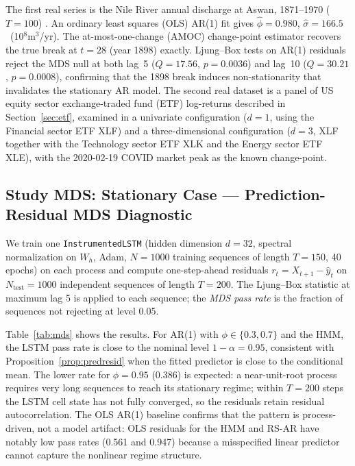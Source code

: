 \documentclass[bj,authoryear]{imsart}
\theoremstyle{plain}
\theoremstyle{definition}
\begin{document}
The first real series is the Nile River annual discharge at Aswan, 1871--1970
($T=100$) \citep{cobb1978problem}.
An ordinary least squares (OLS) AR(1) fit gives $\hat\phi = 0.980$, $\hat\sigma = 166.5$~(10$^8$m$^3$/yr).
The at-most-one-change (AMOC) change-point estimator \citep[Sec.~3.1]{killick2012optimal}
recovers the true break at $t = 28$ (year 1898) exactly.
Ljung--Box tests on AR(1) residuals reject the MDS null at both lag~5
($Q = 17.56$, $p = 0.0036$) and lag~10 ($Q = 30.21$, $p = 0.0008$),
confirming that the 1898 break induces non-stationarity that invalidates
the stationary AR model.
The second real dataset is a panel of US equity sector exchange-traded fund
(ETF) log-returns described in Section~\ref{sec:etf}, examined in a univariate
configuration ($d=1$, using the Financial sector ETF XLF) and a three-dimensional
configuration ($d=3$, XLF together with the Technology sector ETF XLK and the
Energy sector ETF XLE), with the 2020-02-19 COVID market peak as the known
change-point.

\subsection{Study MDS: Stationary Case --- Prediction-Residual MDS Diagnostic}
\label{sec:mds}

We train one \texttt{InstrumentedLSTM} (hidden dimension $d=32$, spectral
normalization on $W_h$, Adam, $N=1000$ training sequences of length $T=150$,
40 epochs) on each process and compute one-step-ahead residuals
$r_t = X_{t+1} - \hat{y}_t$ on $N_\text{test} = 1000$ independent sequences
of length $T = 200$.  The Ljung--Box statistic \citep{ljung1978measure} at maximum lag 5 is applied
to each sequence; the \emph{MDS pass rate} is the fraction of sequences not
rejecting at level 0.05.

Table~\ref{tab:mds} shows the results.
For AR(1) with $\phi \in \{0.3, 0.7\}$ and the HMM, the LSTM pass rate is
close to the nominal level $1-\alpha = 0.95$, consistent with
Proposition~\ref{prop:predresid} when the fitted predictor is close to the
conditional mean.
The lower rate for $\phi = 0.95$ (0.386) is expected: a near-unit-root
process requires very long sequences to reach its stationary regime; within
$T = 200$ steps the LSTM cell state has not fully converged, so the residuals
retain residual autocorrelation.
The OLS AR(1) baseline confirms that the pattern is process-driven, not a
model artifact: OLS residuals for the HMM and RS-AR have notably low pass
rates (0.561 and 0.947) because a misspecified linear predictor cannot capture
the nonlinear regime structure.
\end{document}
